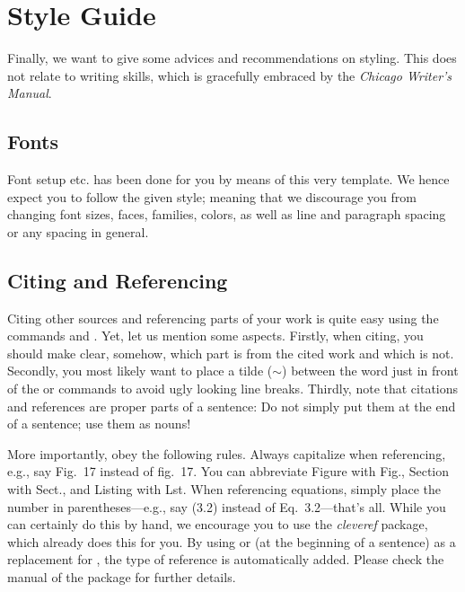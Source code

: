 \chapter{Style Guide}\label{cha:styleGuide}

Finally, we want to give some advices and recommendations on styling. This does not relate to writing skills, which is gracefully embraced by the \emph{Chicago Writer's Manual}.


\section{Fonts}\label{sec:fonts}

Font setup etc. has been done for you by means of this very template. We hence expect you to follow the given style; meaning that we discourage you from changing font sizes, faces, families, colors, as well as line and paragraph spacing or any spacing in general.


\section{Citing and Referencing}\label{sec:citeAndRef}

Citing other sources and referencing parts of your work is quite easy using the commands  and . Yet, let us mention some aspects. Firstly, when citing, you should make clear, somehow, which part is from the cited work and which is not. Secondly, you most likely want to place a tilde ($\sim$) between the word just in front of the  or  commands to avoid ugly looking line breaks. Thirdly, note that citations and references are proper parts of a sentence: Do not simply put them at the end of a sentence; use them as nouns!

More importantly, obey the following rules. Always capitalize when referencing, e.g., say Fig.~17 instead of fig.~17. You can abbreviate Figure with Fig., Section with Sect., and Listing with Lst. When referencing equations, simply place the number in parentheses---e.g., say (3.2) instead of Eq.~3.2---that's all. While you can certainly do this by hand, we encourage you to use the \emph{cleveref} package, which already does this for you. By using  or  (at the beginning of a sentence) as a replacement for , the type of reference is automatically added. Please check the manual of the package for further details.

